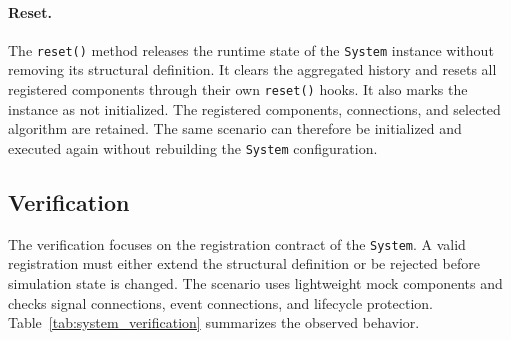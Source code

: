 \paragraph{Reset.}
The \texttt{reset()} method releases the runtime state of the \texttt{System} instance without removing its structural definition.
It clears the aggregated history and resets all registered components through their own \texttt{reset()} hooks.
It also marks the instance as not initialized.
The registered components, connections, and selected algorithm are retained.
The same scenario can therefore be initialized and executed again without rebuilding the \texttt{System} configuration.

\subsection{Verification}

The verification focuses on the registration contract of the \texttt{System}.
A valid registration must either extend the structural definition or be rejected before simulation state is changed.
The scenario uses lightweight mock components and checks signal connections, event connections, and lifecycle protection.
Table~\ref{tab:system_verification} summarizes the observed behavior.


